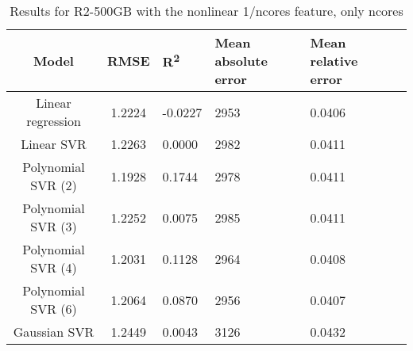 \begin{table}[H]
\centering
\begin{adjustbox}{center}
\begin{tabular}{c | c M{1.2cm} M{2.5cm} M{2.5cm} M{1.8cm}}
Model & RMSE & R\textsuperscript{2} & Mean absolute error & Mean relative error \tabularnewline
\hline
Linear regression & 1.2224 & -0.0227 &   2953 & 0.0406 \\
Linear SVR & 1.2263 & 0.0000 &   2982 & 0.0411 \\
Polynomial SVR (2) & 1.1928 & 0.1744 &   2978 & 0.0411 \\
Polynomial SVR (3) & 1.2252 & 0.0075 &   2985 & 0.0411 \\
Polynomial SVR (4) & 1.2031 & 0.1128 &   2964 & 0.0408 \\
Polynomial SVR (6) & 1.2064 & 0.0870 &   2956 & 0.0407 \\
Gaussian SVR & 1.2449 & 0.0043 &   3126 & 0.0432 \\
\end{tabular}
\end{adjustbox}
\\
\caption{Results for R2-500GB with the nonlinear 1/ncores feature, only ncores}
\label{tab:all_nonlinear_R2_500}
\end{table}
